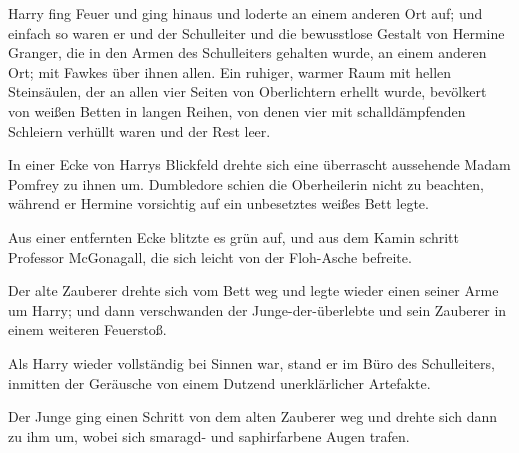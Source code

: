 Harry fing Feuer und ging hinaus und loderte an einem anderen Ort auf; und einfach so waren er und der Schulleiter und die bewusstlose Gestalt von Hermine Granger, die in den Armen des Schulleiters gehalten wurde, an einem anderen Ort; mit Fawkes über ihnen allen. Ein ruhiger, warmer Raum mit hellen Steinsäulen, der an allen vier Seiten von Oberlichtern erhellt wurde, bevölkert von weißen Betten in langen Reihen, von denen vier mit schalldämpfenden Schleiern verhüllt waren und der Rest leer.

In einer Ecke von Harrys Blickfeld drehte sich eine überrascht aussehende Madam Pomfrey zu ihnen um. Dumbledore schien die Oberheilerin nicht zu beachten, während er Hermine vorsichtig auf ein unbesetztes weißes Bett legte.

Aus einer entfernten Ecke blitzte es grün auf, und aus dem Kamin schritt Professor McGonagall, die sich leicht von der Floh-Asche befreite.

Der alte Zauberer drehte sich vom Bett weg und legte wieder einen seiner Arme um Harry; und dann verschwanden der Junge-der-überlebte und sein Zauberer in einem weiteren Feuerstoß.

\later

Als Harry wieder vollständig bei Sinnen war, stand er im Büro des Schulleiters, inmitten der Geräusche von einem Dutzend unerklärlicher Artefakte.

Der Junge ging einen Schritt von dem alten Zauberer weg und drehte sich dann zu ihm um, wobei sich smaragd- und saphirfarbene Augen trafen.


